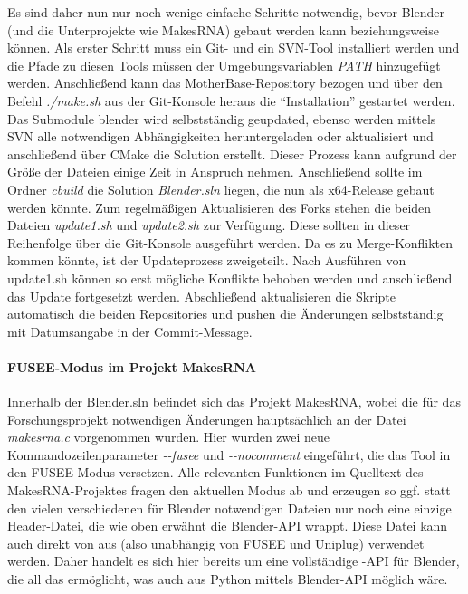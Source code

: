Es sind daher nun nur noch wenige einfache Schritte notwendig, bevor Blender (und die Unterprojekte wie MakesRNA) gebaut werden kann beziehungsweise können. Als erster Schritt muss ein Git- und ein SVN-Tool installiert werden und die Pfade zu diesen Tools müssen der Umgebungsvariablen \emph{PATH} hinzugefügt werden. Anschließend kann das MotherBase-Repository bezogen und über den Befehl \emph{./make.sh} aus der Git-Konsole heraus die \enquote{Installation} gestartet werden. Das Submodule blender wird selbstständig geupdated, ebenso werden mittels SVN alle notwendigen Abhängigkeiten heruntergeladen oder aktualisiert und anschließend über CMake die Solution erstellt. Dieser Prozess kann aufgrund der Größe der Dateien einige Zeit in Anspruch nehmen. Anschließend sollte im Ordner \emph{cbuild} die Solution \emph{Blender.sln} liegen, die nun als x64-Release gebaut werden könnte. Zum regelmäßigen Aktualisieren des Forks stehen die beiden Dateien \emph{update1.sh} und \emph{update2.sh} zur Verfügung. Diese sollten in dieser Reihenfolge über die Git-Konsole ausgeführt werden. Da es zu Merge-Konflikten kommen könnte, ist der Updateprozess zweigeteilt. Nach Ausführen von update1.sh können so erst mögliche Konflikte behoben werden und anschließend das Update fortgesetzt werden. Abschließend aktualisieren die Skripte automatisch die beiden Repositories und pushen die Änderungen selbstständig mit Datumsangabe in der Commit-Message.

\paragraph{FUSEE-Modus im Projekt MakesRNA}

Innerhalb der Blender.sln befindet sich das Projekt MakesRNA, wobei die für das Forschungsprojekt notwendigen Änderungen hauptsächlich an der Datei \emph{makesrna.c} vorgenommen wurden. Hier wurden zwei neue Kommandozeilenparameter \emph{-{}-fusee} und \emph{-{}-nocomment} eingeführt, die das Tool in den FUSEE-Modus versetzen. Alle relevanten Funktionen im Quelltext des MakesRNA-Projektes fragen den aktuellen Modus ab und erzeugen so ggf. statt den vielen verschiedenen für Blender notwendigen Dateien nur noch eine einzige Header-Datei, die wie oben erwähnt die Blender-API wrappt. Diese Datei kann auch direkt von \CC{} aus (also unabhängig von FUSEE und Uniplug) verwendet werden. Daher handelt es sich hier bereits um eine vollständige \CC-API für Blender, die all das ermöglicht, was auch aus Python mittels Blender-API möglich wäre.

